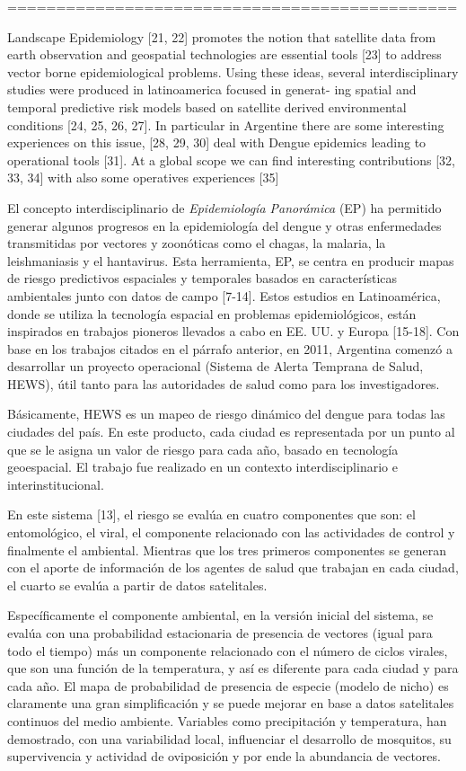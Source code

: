 ==============================================

Landscape Epidemiology [21, 22] promotes the notion that satellite data
from earth observation and geospatial technologies are essential tools [23] to
address vector borne epidemiological problems. Using these ideas, several
interdisciplinary studies were produced in latinoamerica focused in generat-
ing spatial and temporal predictive risk models based on satellite derived
environmental conditions [24, 25, 26, 27]. In particular in Argentine there
are some interesting experiences on this issue, [28, 29, 30] deal with Dengue
epidemics leading to operational tools [31]. At a global scope we can find
interesting contributions [32, 33, 34] with also some operatives experiences
[35]


El concepto interdisciplinario de \textit{Epidemiología Panorámica} (EP)
ha permitido generar algunos progresos en la epidemiología del dengue y otras
enfermedades transmitidas por vectores y zoonóticas como el chagas, la
malaria, la leishmaniasis y el hantavirus. Esta herramienta, EP, se centra en
producir mapas de riesgo predictivos espaciales y temporales basados en
características ambientales junto con datos de campo [7-14].
Estos estudios en Latinoamérica, donde se utiliza la tecnología espacial en
problemas epidemiológicos, están inspirados en trabajos pioneros llevados a cabo
en EE. UU. y Europa [15-18].
Con base en los trabajos citados en el párrafo anterior, en 2011, Argentina
comenzó a desarrollar un proyecto operacional
(Sistema de Alerta Temprana de Salud, HEWS), útil tanto para las autoridades de
salud como para los investigadores.

Básicamente, HEWS es un mapeo de riesgo
dinámico del dengue para todas las ciudades del país. En este producto, cada
ciudad es representada por un punto al que se le asigna un valor de riesgo para
cada año, basado en tecnología geoespacial. El trabajo fue realizado en un
contexto interdisciplinario e interinstitucional.

En este sistema [13], el riesgo se evalúa en cuatro componentes que son: el
entomológico, el viral, el componente relacionado con las actividades de
control y finalmente el ambiental. Mientras que los tres primeros componentes
se generan con el aporte de información de los agentes de salud que trabajan en cada
ciudad, el cuarto se evalúa a partir de datos satelitales.

Específicamente el componente ambiental, en la versión inicial del sistema, se
evalúa con una probabilidad estacionaria de presencia de vectores (igual para
todo el tiempo) más un componente relacionado con el número de ciclos virales,
que son una función de la temperatura, y así es diferente para cada ciudad y
para cada año. El mapa de probabilidad de presencia de especie (modelo de nicho)
es claramente una gran simplificación y se puede mejorar en base a datos
satelitales continuos del medio ambiente. Variables como precipitación y
temperatura, han demostrado, con una variabilidad local, influenciar el
desarrollo de mosquitos, su supervivencia y actividad de oviposición y por ende
la abundancia de vectores.

